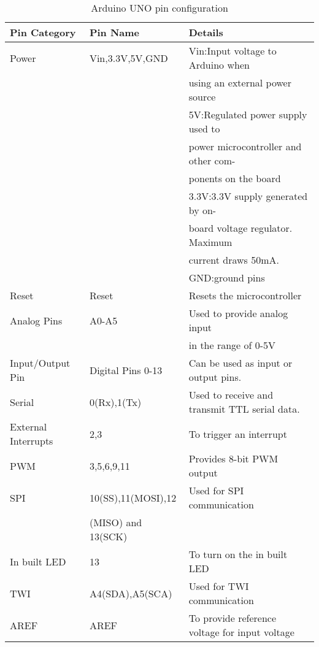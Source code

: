 \documentclass[12pt,a4paper]{article}
\begin{document}
\begin{center}
\begin{center}
\begin{table}[H]
	\caption{Arduino UNO pin configuration}
	\vspace{0.3cm}
	\begin{tabular}{|l|l|l|}
		
		\hline
		\textbf {Pin Category}& \textbf{Pin Name} & \textbf{Details}\\
		\hline
		Power &  Vin,3.3V,5V,GND & Vin:Input voltage to Arduino when \\ 
		 \ &  \ & using an external power source\\
		 \ &  \ & 5V:Regulated power supply used to\\
		\ &  \ & power microcontroller and other com-\\
		 \ & \ &ponents on the board\\
		\ &  \ & 3.3V:3.3V supply generated by on-\\
		\ &  \ & board voltage regulator. Maximum\\
		\ & \ & current draws 50mA.\\
		\ & \ & GND:ground pins\\
		\hline
		Reset & Reset & Resets the microcontroller  \\	
		\hline
		Analog Pins &  A0-A5 & Used to provide analog input\\
			\ & \ & in the range of 0-5V\\
		\hline
		Input/Output Pin & Digital Pins 0-13 & Can be used as input or output pins.\\
		\hline
		Serial &  0(Rx),1(Tx) & Used to receive and transmit TTL serial data.\\
		\hline
		External Interrupts &  2,3 & To trigger an interrupt\\
		\hline
		PWM &  3,5,6,9,11 &Provides 8-bit PWM output\\
		\hline
		SPI &  10(SS),11(MOSI),12 & Used for SPI communication\\
		\ &  (MISO) and 13(SCK) & \ \\
	   \hline
		In built LED &  13 & To turn on the in built LED\\
		\hline
		TWI &  A4(SDA),A5(SCA) & Used for TWI communication\\
		\hline
		AREF &  AREF & To provide reference voltage for input voltage\\
	
		\hline
	\end{tabular}
\end{table}


\end{center}
\end{center}
\end{document}
